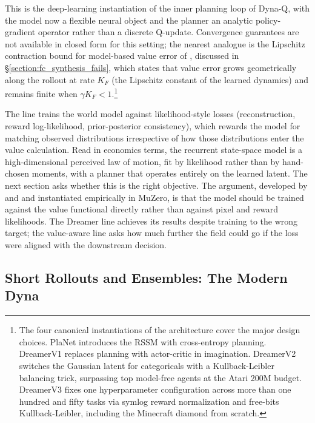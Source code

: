 This is the deep-learning instantiation of the inner planning loop of Dyna-Q, with the model now a flexible neural object and the planner an analytic policy-gradient operator rather than a discrete Q-update. Convergence guarantees are not available in closed form for this setting; the nearest analogue is the Lipschitz contraction bound for model-based value error of \citet{Asadi2018Lipschitz}, discussed in \S\ref{section:fc_synthesis_fails}, which states that value error grows geometrically along the rollout at rate $K_F$ (the Lipschitz constant of the learned dynamics) and remains finite when $\gamma K_F < 1$.\footnote{The four canonical instantiations of the architecture cover the major design choices. PlaNet \citep{HafnerPlaNet2019} introduces the RSSM with cross-entropy planning. DreamerV1 \citep{HafnerDreamer2020} replaces planning with actor-critic in imagination. DreamerV2 \citep{HafnerDreamerV2_2021} switches the Gaussian latent for categoricals with a Kullback-Leibler balancing trick, surpassing top model-free agents at the Atari 200M budget. DreamerV3 \citep{HafnerDreamerV3_2025} fixes one hyperparameter configuration across more than one hundred and fifty tasks via symlog reward normalization and free-bits Kullback-Leibler, including the Minecraft diamond from scratch.}

The line trains the world model against likelihood-style losses (reconstruction, reward log-likelihood, prior-posterior consistency), which rewards the model for matching observed distributions irrespective of how those distributions enter the value calculation. Read in economics terms, the recurrent state-space model is a high-dimensional perceived law of motion, fit by likelihood rather than by hand-chosen moments, with a planner that operates entirely on the learned latent. The next section asks whether this is the right objective. The argument, developed by \citet{FarahmandVAML2017} and \citet{GrimmVALEQ2020} and instantiated empirically in MuZero, is that the model should be trained against the value functional directly rather than against pixel and reward likelihoods. The Dreamer line achieves its results despite training to the wrong target; the value-aware line asks how much further the field could go if the loss were aligned with the downstream decision.

\subsection{Short Rollouts and Ensembles: The Modern Dyna}
\label{section:fc_mbpo}

